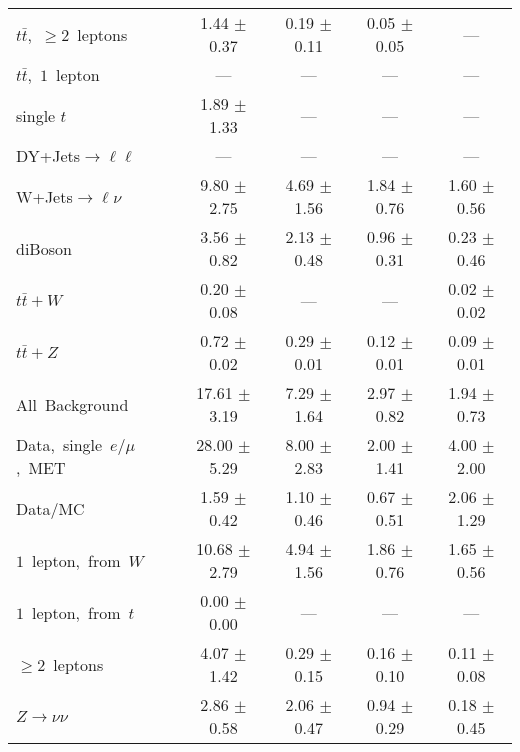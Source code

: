\documentclass{article}
\begin{document}
\begin{longtable}{|l|c|c|c|c|}
$t\bar{t}$,~$\ge2$~leptons & 1.44 $\pm$ 0.37  & 0.19 $\pm$ 0.11  & 0.05 $\pm$ 0.05  & --- \\* 
$t\bar{t}$,~$1$~lepton & ---  & ---  & ---  & --- \\* 
single $t$  & 1.89 $\pm$ 1.33  & ---  & ---  & --- \\* 
DY+Jets$\rightarrow\ell\ell$  & ---  & ---  & ---  & --- \\* 
W+Jets$\rightarrow\ell\nu$  & 9.80 $\pm$ 2.75  & 4.69 $\pm$ 1.56  & 1.84 $\pm$ 0.76  & 1.60 $\pm$ 0.56 \\* 
diBoson  & 3.56 $\pm$ 0.82  & 2.13 $\pm$ 0.48  & 0.96 $\pm$ 0.31  & 0.23 $\pm$ 0.46 \\* 
$t\bar{t}+W$  & 0.20 $\pm$ 0.08  & ---  & ---  & 0.02 $\pm$ 0.02 \\* 
$t\bar{t}+Z$  & 0.72 $\pm$ 0.02  & 0.29 $\pm$ 0.01  & 0.12 $\pm$ 0.01  & 0.09 $\pm$ 0.01 \\* 
\hline \hline 
All~Background  & 17.61 $\pm$ 3.19  & 7.29 $\pm$ 1.64  & 2.97 $\pm$ 0.82  & 1.94 $\pm$ 0.73 \\* 
Data,~single~$e/\mu$,~MET  & 28.00 $\pm$ 5.29  & 8.00 $\pm$ 2.83  & 2.00 $\pm$ 1.41  & 4.00 $\pm$ 2.00 \\* 
Data/MC  & 1.59 $\pm$ 0.42  & 1.10 $\pm$ 0.46  & 0.67 $\pm$ 0.51  & 2.06 $\pm$ 1.29 \\* 
\hline \hline 
$1$~lepton,~from~$W$  & 10.68 $\pm$ 2.79  & 4.94 $\pm$ 1.56  & 1.86 $\pm$ 0.76  & 1.65 $\pm$ 0.56 \\* 
$1$~lepton,~from~$t$  & 0.00 $\pm$ 0.00  & ---  & ---  & --- \\* 
$\ge2$~leptons  & 4.07 $\pm$ 1.42  & 0.29 $\pm$ 0.15  & 0.16 $\pm$ 0.10  & 0.11 $\pm$ 0.08 \\* 
$Z\rightarrow\nu\nu$  & 2.86 $\pm$ 0.58  & 2.06 $\pm$ 0.47  & 0.94 $\pm$ 0.29  & 0.18 $\pm$ 0.45 \\* 
\hline 
\end{longtable} 

 
 
 
 
\pagebreak 

 
 
 
 
\end{document}
